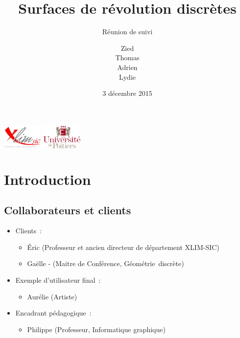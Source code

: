\documentclass{beamer}
\title[R\'eunion de suivi]{Surfaces de r\'evolution discrètes}
\subtitle{R\'eunion de suivi}
\author[]{Zied \smallcaps{Ben} \smallcaps{Othmane} \\ Thomas \smallcaps{Benoist}
	\\ Adrien \smallcaps{Bisutti} \\ Lydie \smallcaps{Richaume}}
\institute{Universit\'e de Poitiers}
\date{3 décembre 2015}
\begin{document}


\begin{frame}
	\titlepage
	\includegraphics[width=2cm]{../Images/logo-Xlim.png}
	\hfill
	\includegraphics[width=2cm]{../Images/logo_univ_poitiers.png}
\end{frame}




\section{Introduction}


	\subsection{Collaborateurs et clients}
	\begin{frame}{\subsecname}
		\begin{itemize}
			\item Clients~:
				\begin{itemize}
					\item \'Eric  (Professeur et ancien
						directeur de d\'epartement XLIM-SIC)
					\item Gaëlle -
						(Maitre de Conf\'erence, G\'eom\'etrie~discr\`ete)
				\end{itemize}
			\item Exemple d'utilisateur final~:
				\begin{itemize}
					\item Aur\'elie  (Artiste)
				\end{itemize}
			\item Encadrant p\'edagogique~: 
				\begin{itemize}
					\item Philippe  (Professeur, Informatique
						graphique)
				\end{itemize}
		\end{itemize}
	\end{frame}
\end{document}
